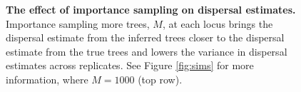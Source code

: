 \documentclass[12pt]{article}
\begin{document}
\begin{figure}[!hb]
\begin{center}

\end{center}

\caption{
\textbf{The effect of importance sampling on dispersal estimates.}
Importance sampling more trees, $M$, at each locus brings the dispersal estimate from the inferred trees closer to the dispersal estimate from the true trees and lowers the variance in dispersal estimates across replicates. See Figure \ref{fig:sims} for more information, where $M=1000$ (top row).
}

\label{fig:sup_sigma_imp}
\end{figure}


  

  
  
\end{document}
